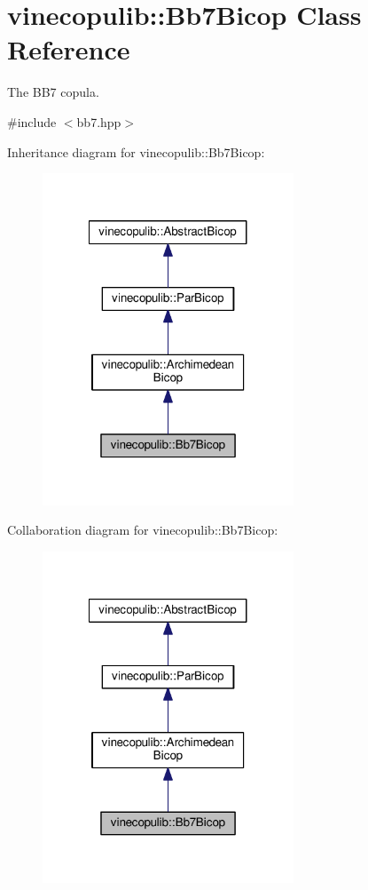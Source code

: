\hypertarget{classvinecopulib_1_1_bb7_bicop}{\section{vinecopulib\+:\+:Bb7\+Bicop Class Reference}
\label{classvinecopulib_1_1_bb7_bicop}
}


The B\+B7 copula.  




{\ttfamily \#include $<$bb7.\+hpp$>$}



Inheritance diagram for vinecopulib\+:\+:Bb7\+Bicop\+:\nopagebreak
\begin{figure}[H]
\begin{center}
\leavevmode
\includegraphics[width=212pt]{classvinecopulib_1_1_bb7_bicop__inherit__graph}
\end{center}
\end{figure}


Collaboration diagram for vinecopulib\+:\+:Bb7\+Bicop\+:\nopagebreak
\begin{figure}[H]
\begin{center}
\leavevmode
\includegraphics[width=212pt]{classvinecopulib_1_1_bb7_bicop__coll__graph}
\end{center}
\end{figure}
